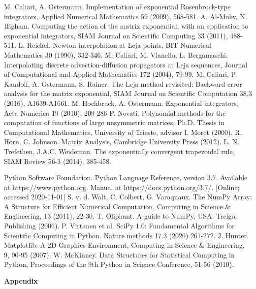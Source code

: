 \documentclass{scrartcl}
\begin{document}
\begin{thebibliography}{13}
	 M. Caliari, A. Ostermann. Implementation of exponential Rosenbrock-type integrators, Applied Numerical Mathematics 59 (2009), 568-581.
	 A. Al-Mohy, N. Higham. Computing the action of the matrix exponential, with an application to exponential integrators, SIAM Journal on Scientific Computing 33 (2011), 488-511.
	 L. Reichel. Newton interpolation at Leja points, BIT Numerical Mathematics 30 (1990), 332-346.
	 M. Caliari, M. Vianello, L. Bergamaschi. Interpolating discrete advection-diffusion propagators at Leja sequences, Journal of Computational and Applied Mathematics 172 (2004), 79-99.
	 M. Caliari, P. Kandolf, A. Ostermann, S. Rainer. The Leja method revisited: Backward error analysis for the matrix exponential, SIAM Journal on Scientific Computation 38.3 (2016), A1639-A1661.
	 M. Hochbruck, A. Ostermann. Exponential integrators, Acta Numerica 19 (2010), 209-286
	 P. Novati. Polynomial methods for the computation of functions of large unsymmetric matrices, Ph.D. Thesis in Computational Mathematics, University of Trieste, advisor I. Moret (2000).
	 R. Horn, C. Johnson. Matrix Analysis, Cambridge University Press (2012).
	 L. N. Trefethen, J.A.C. Weideman. The exponentially convergent trapezoidal rule, SIAM Review 56-3 (2014), 385-458.
	
	 Python Software Foundation. Python Language Reference, version 3.7. Available at https://www.python.org. Manual at https://docs.python.org/3.7/. [Online; accessed 2020-11-01]
	 S. v. d. Walt, C. Colbert, G. Varoquaux. The NumPy Array: A Structure for Efficient Numerical Computation, Computing in Science \& Engineering, 13 (2011), 22-30.
	 T. Oliphant. A guide to NumPy, USA: Trelgol Publishing (2006).
	 P. Virtanen et al. SciPy 1.0: Fundamental Algorithms for Scientific Computing in Python. Nature methods 17.3 (2020) 261-272.
	 J. Hunter. Matplotlib: A 2D Graphics Environment, Computing in Science \& Engineering, 9, 90-95 (2007).
	 W. McKinney. Data Structures for Statistical Computing in Python, Proceedings of the 9th Python in Science Conference, 51-56 (2010).
\end{thebibliography}

\newpage
\hspace{0pt}
\vfill
\begin{center}
	\textbf{\Huge Appendix}
\end{center}
\vfill
\hspace{0pt}
\end{document}
